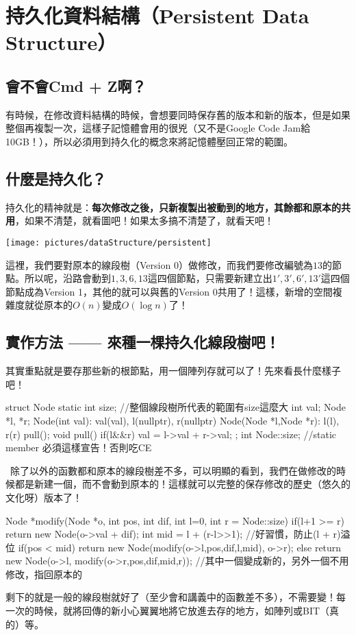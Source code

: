 	\section{持久化資料結構（Persistent Data Structure）}
		\subsection{會不會Cmd + Z啊？}
			有時候，在修改資料結構的時候，會想要同時保存舊的版本和新的版本，但是如果整個再複製一次，這樣子記憶體會用的很兇（又不是Google Code Jam給10GB！），所以必須用到持久化的概念來將記憶體壓回正常的範圍。
		\subsection{什麼是持久化？}
			持久化的精神就是：\textbf{每次修改之後，只新複製出被動到的地方，其餘都和原本的共用}，如果不清楚，就看圖吧！如果太多搞不清楚了，就看天吧！
			\begin{center}
				\texttt{[image: pictures/dataStructure/persistent]}
			\end{center}
			這裡，我們要對原本的線段樹（Version 0）做修改，而我們要修改編號為$13$的節點。所以呢，沿路會動到$1, 3, 6, 13$這四個節點，只需要新建立出$1', 3', 6', 13'$這四個節點成為Version 1，其他的就可以與舊的Version 0共用了！這樣，新增的空間複雜度就從原本的$O(n)$變成$O(\log n)$了！
		\subsection{實作方法 —— 來種一棵持久化線段樹吧！}
			其實重點就是要存那些新的根節點，用一個陣列存就可以了！先來看長什麼樣子吧！
			\begin{C++}
struct Node{
	static int size; //整個線段樹所代表的範圍有size這麼大
	int val;
	Node *l, *r;
	Node(int val): val(val), l(nullptr), r(nullptr){}
	Node(Node *l,Node *r): l(l), r(r){ pull(); }
	void pull() { if(l&&r) val = l->val + r->val; }
};
int Node::size; //static member 必須這樣宣告！否則吃CE
			\end{C++}
			 除了以外的函數都和原本的線段樹差不多，可以明顯的看到，我們在做修改的時候都是新建一個，而不會動到原本的！這樣就可以完整的保存修改的歷史（悠久的文化呀）版本了！
			 \begin{C++}
Node *modify(Node *o, int pos, int dif, 
					   int l=0, int r = Node::size){ 
	if(l+1 >= r) return new Node(o->val + dif);
	int mid = l + (r-l>>1); //好習慣，防止(l + r)溢位
	if(pos < mid)
		return new Node(modify(o->l,pos,dif,l,mid), o->r); 
	else 
		return new Node(o->l, modify(o->r,pos,dif,mid,r));
	//其中一個變成新的，另外一個不用修改，指回原本的
}
			 \end{C++}
			剩下的就是一般的線段樹就好了（至少會和講義中的函數差不多），不需要變！每一次的時候，就將回傳的新小心翼翼地將它放進去存的地方，如陣列或BIT（真的）等。
